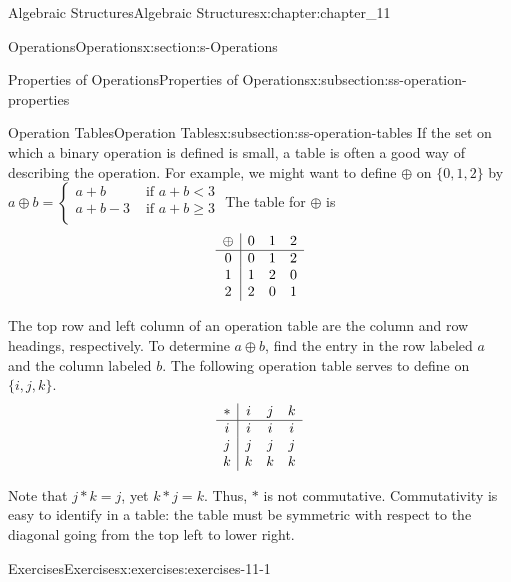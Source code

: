 \documentclass[twoside,10pt,]{book}
\numberwithin{equation}{section}
\begin{document}
\begin{chapterptx}{Algebraic Structures}{}{Algebraic Structures}{}{}{x:chapter:chapter_11}
\begin{sectionptx}{Operations}{}{Operations}{}{}{x:section:s-Operations}
\begin{subsectionptx}{Properties of Operations}{}{Properties of Operations}{}{}{x:subsection:ss-operation-properties}
\end{subsectionptx}
%
%
\typeout{************************************************}
\typeout{************************************************}
%
\begin{subsectionptx}{Operation Tables}{}{Operation Tables}{}{}{x:subsection:ss-operation-tables}
%
If the set on which a binary operation is defined is small, a table is often a good way of describing the operation. For example, we might want to define \(\oplus\) on \(\{0, 1, 2\}\) by \(a\oplus b=\left\{
\begin{array}{cc}
a+b & \textrm{ if } a+b < 3 \\
a+b-3 & \textrm{ if } a+b\geq 3 \\
\end{array}
\right.\) The table for \(\oplus\) is%
\begin{equation*}
\begin{array}{c | c c c}
\oplus & 0 & 1 & 2 \\ \hline
0 & 0 & 1 & 2 \\
1 &  1 & 2 & 0 \\
2 & 2 & 0 & 1
\end{array}
\end{equation*}
%
\par
The top row and left column of an operation table are the column and row headings, respectively. To determine \(a\oplus b\), find the entry in the row labeled \(a\) and the column labeled \(b\). The following operation table serves to define \textasteriskcentered{} on \(\{i, j, k\}\).%
\begin{equation*}
\begin{array}{c | c c c}
* & i & j & k \\ \hline
i & i & i & i \\
j &  j & j & j \\
k & k & k & k
\end{array}
\end{equation*}
%
\par
Note that \(j*k = j\), yet \(k * j = k\). Thus, \(*\) is not commutative. Commutativity is easy to identify in a table: the table must be symmetric with respect to the diagonal going from the top left to lower right.%
\end{subsectionptx}
%
%
\typeout{************************************************}
\typeout{************************************************}
%
\begin{exercises-subsection}{Exercises}{}{Exercises}{}{}{x:exercises:exercises-11-1}

\end{exercises-subsection}
\end{sectionptx}
\end{chapterptx}
\end{document}
